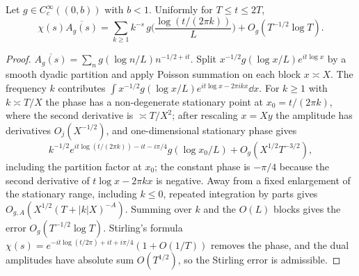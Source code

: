 \documentclass[11pt,colorlinks]{charlie}
\begin{document}
\begin{lemma}\label{lem:dualfactor}
Let $g\in C_c^\infty((0,b))$ with $b<1$. Uniformly for $T\le t\le2T$,
\[
 \chi(s)\overline{A_g(s)}=\sum_{k\ge1}k^{-s}\,g\Big(\frac{\log(t/(2\pi k))}{L}\Big)+O_g(T^{-1/2}\log T).
\]
\end{lemma}
\begin{proof}
$\overline{A_g(s)}=\sum_ng(\log n/L)n^{-1/2+it}$. Split $x^{-1/2}g(\log x/L)e^{it\log x}$ by a smooth dyadic partition and apply Poisson summation on each block $x\asymp X$. The frequency $k$ contributes $\int x^{-1/2}g(\log x/L)e^{it\log x-2\pi ikx}\dd x$. For $k\ge1$ with $k\asymp T/X$ the phase has a non-degenerate stationary point at $x_0=t/(2\pi k)$, where the second derivative is $\asymp T/X^2$; after rescaling $x=Xy$ the amplitude has derivatives $O_j(X^{-1/2})$, and one-dimensional stationary phase gives
\[
 k^{-1/2}e^{it\log(t/(2\pi k))-it-i\pi/4}g(\log x_0/L)+O_g(X^{1/2}T^{-3/2}),
\]
including the partition factor at $x_0$; the constant phase is $-\pi/4$ because the second derivative of $t\log x-2\pi kx$ is negative. Away from a fixed enlargement of the stationary range, including $k\le0$, repeated integration by parts gives $O_{g,A}(X^{1/2}(T+|k|X)^{-A})$. Summing over $k$ and the $O(L)$ blocks gives the error $O_g(T^{-1/2}\log T)$. Stirling's formula $\chi(s)=e^{-it\log(t/2\pi)+it+i\pi/4}(1+O(1/T))$ removes the phase, and the dual amplitudes have absolute sum $O(T^{1/2})$, so the Stirling error is admissible.
\end{proof}
\end{document}
